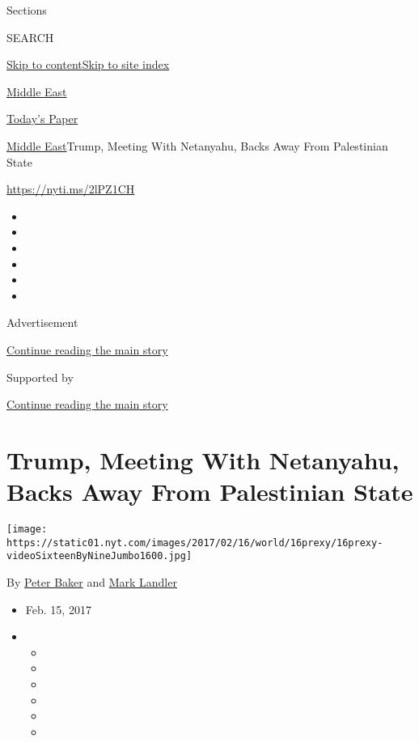 Sections

SEARCH

\protect\hyperlink{site-content}{Skip to
content}\protect\hyperlink{site-index}{Skip to site index}

\href{https://www.nytimes.com/section/world/middleeast}{Middle East}

\href{https://myaccount.nytimes.com/auth/login?response_type=cookie\&client_id=vi}{}

\href{https://www.nytimes.com/section/todayspaper}{Today's Paper}

\href{/section/world/middleeast}{Middle East}\textbar{}Trump, Meeting
With Netanyahu, Backs Away From Palestinian State

\url{https://nyti.ms/2lPZ1CH}

\begin{itemize}
\item
\item
\item
\item
\item
\item
\end{itemize}

Advertisement

\protect\hyperlink{after-top}{Continue reading the main story}

Supported by

\protect\hyperlink{after-sponsor}{Continue reading the main story}

\hypertarget{trump-meeting-with-netanyahu-backs-away-from-palestinian-state}{%
\section{Trump, Meeting With Netanyahu, Backs Away From Palestinian
State}\label{trump-meeting-with-netanyahu-backs-away-from-palestinian-state}}

\texttt{[image: https://static01.nyt.com/images/2017/02/16/world/16prexy/16prexy-videoSixteenByNineJumbo1600.jpg]}

By \href{http://www.nytimes.com/by/peter-baker}{Peter Baker} and
\href{http://www.nytimes.com/by/mark-landler}{Mark Landler}

\begin{itemize}
\item
  Feb. 15, 2017
\item
  \begin{itemize}
  \item
  \item
  \item
  \item
  \item
  \item
  \end{itemize}
\end{itemize}

